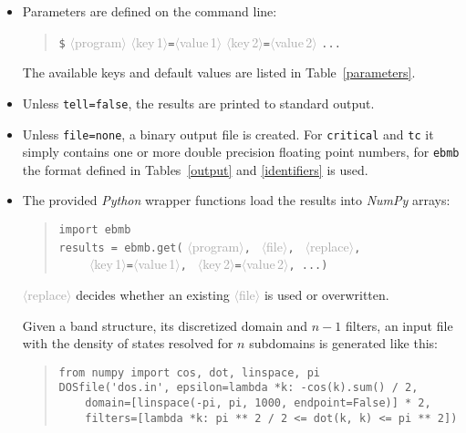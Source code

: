 \documentclass[a4paper]{article}
\def\dummy#1{\textcolor{darkgray}{$\langle$#1$\rangle$}}
\begin{document}
   \begin{itemize}
      \item
         Parameters are defined on the command line:
         \begin{quote}
            \verb|$| \dummy{program}
               \dummy{key\,1}\verb|=|\dummy{value\,1}
               \dummy{key\,2}\verb|=|\dummy{value\,2} \verb|...|
         \end{quote}
         The available keys and default values are listed in
         Table~\ref{parameters}.

      \item
         Unless \texttt{tell=false}, the results are printed to standard output.

      \item
         Unless \texttt{file=none}, a binary output file is created. For
         \texttt{critical} and \texttt{tc} it simply contains one or more double
         precision floating point numbers, for \texttt{ebmb} the format defined
         in Tables~\ref{output} and \ref{identifiers} is used.

      \item
         The provided \emph{Python} wrapper functions load the results into
         \emph{NumPy} arrays:
         \begin{quote}
            \verb|import ebmb| \\
            \verb|results = ebmb.get(|%
            \dummy{program}\verb|, |%
            \dummy{file}\verb|, |%
            \dummy{replace}\verb|,| \\
            \verb|    |%
               \dummy{key\,1}\verb|=|\dummy{value\,1}\verb|, |%
               \dummy{key\,2}\verb|=|\dummy{value\,2}\verb|, ...|\verb|)|
         \end{quote}
         \dummy{replace} decides whether an existing \dummy{file} is used or
         overwritten.

         Given a band structure, its discretized domain and $n - 1$ filters, an
         input file with the density of states resolved for $n$ subdomains is
         generated like this:
         \begin{quote}
            \verb|from numpy import cos, dot, linspace, pi| \\
            \verb|DOSfile('dos.in', epsilon=lambda *k: -cos(k).sum() / 2, | \\
            \verb|    domain=[linspace(-pi, pi, 1000, endpoint=False)] * 2,| \\
            \verb|    filters=[lambda *k: pi ** 2 / 2 <= dot(k, k) <= pi ** 2])|
         \end{quote}
   \end{itemize}
\end{document}
